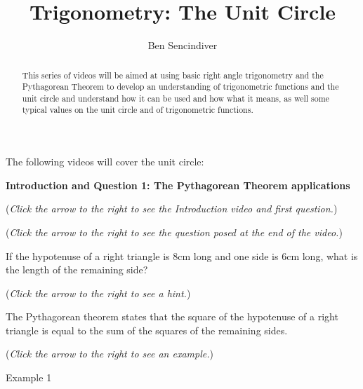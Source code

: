 \documentclass{ximera}
\title[Prerequisite Videos: ]{Trigonometry: The Unit Circle}
\author{Ben Sencindiver}
\begin{document}
\begin{abstract}
  This series of videos will be aimed at using basic right angle trigonometry
  and the Pythagorean Theorem to develop an understanding of trigonometric
  functions and the unit circle and understand how it can be used and
  how what it means, as well some typical values on the unit circle
  and of trigonometric functions.
\end{abstract}
\maketitle

The following videos will cover the unit circle:

\textbf{Introduction and Question 1: The Pythagorean Theorem applications}
\begin{question}
\begin{flushright}
{\color{blue}(\emph{Click the arrow to the right to see the Introduction video and first question.})}
\end{flushright}
\begin{center}
\begin{expandable}
{\color{blue}(\emph{Click the arrow to the right to see the question
posed at the end of the video.})}
\begin{expandable}
If the hypotenuse of a right triangle is $8$cm long and one side is
$6$cm long, what is the length of the remaining side?
\begin{multipleChoice}
\end{multipleChoice}
\begin{flushright}
{\color{blue}(\emph{Click the arrow to the right to see a hint.})}
\end{flushright}
\begin{expandable}
The Pythagorean theorem states that the square of the hypotenuse
of a right triangle is equal to the sum of the squares of the remaining
sides.
\end{expandable}
\begin{flushright}
{\color{blue}(\emph{Click the arrow to the right to see an example.})}
\end{flushright}
\begin{expandable}
Example 1
\end{expandable}
\end{expandable}
\end{expandable}
\end{center}
\end{question}
\end{document}
